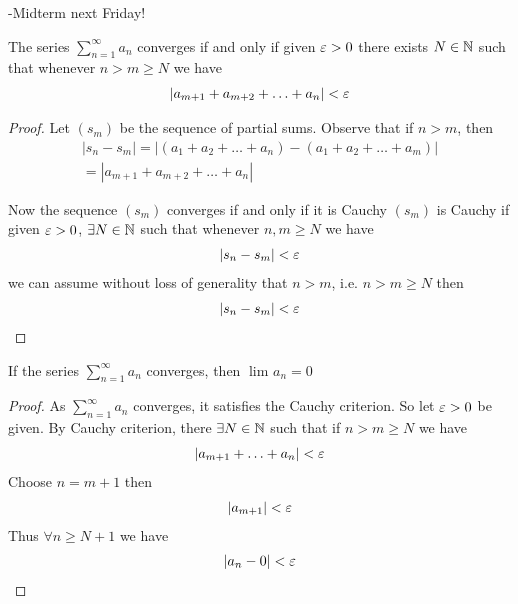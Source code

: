 
-Midterm next Friday!

\begin{theorem}
	The series $\sum_{n=1}^{\infty} a_n$ converges if and only if given $\e > 0$ there exists $N \in \mathbb{N}$ such that whenever $n > m \ge N$ we have
	\begin{align}
		\left|a_{m+1} + a_{m+2} + \ldots + a_n\right| < \e
	\end{align}
\end{theorem}

\begin{proof}
	Let $\left( s_m \right) $ be the sequence of partial sums. Observe that if $n > m$, then 
	\begin{align}
		\left|s_n - s_m\right| = \left|\left( a_1 + a_2 + \ldots + a_n \right) - \left( a_1 + a_2 + \ldots + a_m \right)\right| \\
		= \left|a_{m+1} + a_{m+2} + \ldots + a_n\right|
	\end{align}

	Now the sequence $\left( s_m \right) $ converges if and only if it is Cauchy $\left( s_m \right) $ is Cauchy if given $\e > 0$, $\exists N \in \mathbb{N}$ such that whenever $n, m \ge N$ we have
	\begin{align}
		\left|s_n - s_m\right| < \e
	\end{align}
	we can assume without loss of generality that $n > m$, i.e.  $n > m \ge N$ then 
	\begin{align}
		\left|s_n - s_m\right| < \e
	\end{align}
\end{proof}

\begin{theorem}
	If the series $\sum_{n=1}^{\infty} a_n$ converges, then $\lim_{} a_n = 0$
\end{theorem}

\begin{proof}
	As $\sum_{n=1}^{\infty} a_n$ converges, it satisfies the Cauchy criterion. So let $\e > 0$ be given. By Cauchy criterion, there $\exists N \in \mathbb{N}$ such that if $n > m \ge N$ we have
	\begin{align}
		\left|a_{m+1} + \ldots + a_n\right| < \e
	\end{align}
	Choose $n = m + 1$ then 
	\begin{align}
		\left|a_{m+1}\right| < \e
	\end{align}
	Thus $\forall n \ge N+1$ we have
	\begin{align}
		\left|a_n - 0 \right| < \e
	\end{align}
\end{proof}

